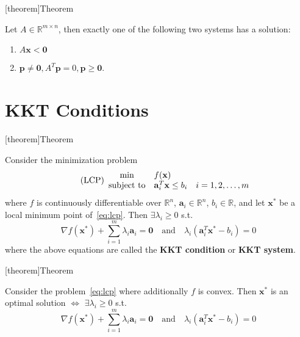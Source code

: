 \documentclass[12pt]{report}
\theoremstyle{definition}
\begin{document}
[theorem]{Theorem}
\begin{gordan's alternative theorem}
    Let $A\in\mathbb{R}^{m\times n}$, then exactly one of the following two
    systems has a solution:
    \begin{enumerate}[label = (\roman*)]
        \item $A\mathbf{x}<\mathbf{0}$
        \item $\mathbf{p}\neq \mathbf{0},A^T\mathbf{p}=0,\mathbf{p}\ge \mathbf{0}$.
    \end{enumerate}
\end{gordan's alternative theorem}


\section{KKT Conditions}

[theorem]{Theorem}
\begin{KKT for linearly constrained problems}
    Consider the minimization problem
    \begin{equation}\label{eq:lcp}
        \tag{LCP}
        \begin{array}{c @{\quad} l @{\quad} l}
            \min & f(\mathbf{x}) & \\
            \text{subject to} & \mathbf{a}_i^T\mathbf{x}\le b_i & i=1,2,\ldots,m \\
        \end{array} 
    \end{equation} 
    where $f$ is continuously differentiable over $\mathbb{R}^{n}$,
    $\mathbf{a}_i\in\mathbb{R}^{n}$, $b_i\in\mathbb{R}$, and let $\mathbf{x}^*$
    be a local minimum point of~\eqref{eq:lcp}. Then $\exists \lambda_i\ge 0$
    s.t.
    \[
        \nabla f(\mathbf{x}^*)+\sum_{i=1}^{m} \lambda_i\mathbf{a}_i=\mathbf{0}
        \quad\text{and}\quad
        \lambda_i(\mathbf{a}_i^T\mathbf{x}^*-b_i)=0
    \]
    where the above equations are called the \textbf{KKT condition} or
    \textbf{KKT system}.
\end{KKT for linearly constrained problems}

[theorem]{Theorem}
\begin{KKT for convex linearly constrained problem}
    Consider the problem~\eqref{eq:lcp} where additionally $f$ is convex.
    Then $\mathbf{x}^*$ is an optimal solution $\iff$ $\exists \lambda_i\ge 0$ s.t.
    \[
        \nabla f(\mathbf{x}^*)+\sum_{i=1}^{m} \lambda_i\mathbf{a}_i=\mathbf{0}
        \quad\text{and}\quad
        \lambda_i(\mathbf{a}_i^T\mathbf{x}^*-b_i)=0
    \]
\end{KKT for convex linearly constrained problem}
\end{document}
